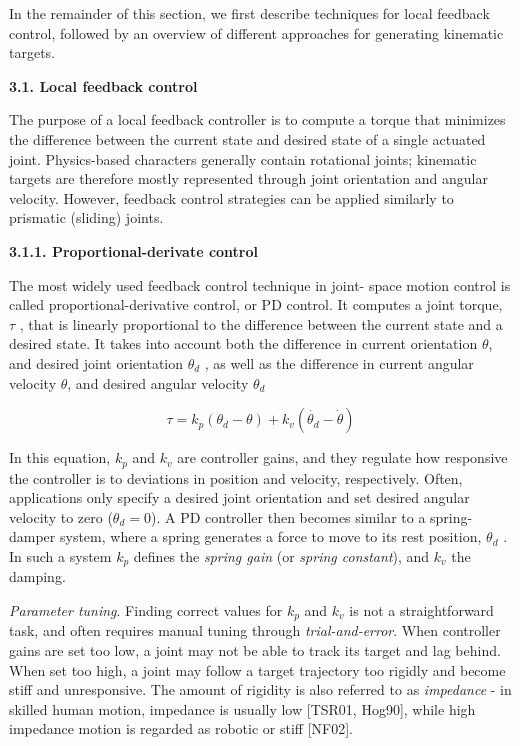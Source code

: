 \documentclass[runningheads,a4paper,10pt]{llncs}
\begin{document}
In the remainder of this section, we first describe techniques for local feedback control, followed by an overview of different approaches for generating kinematic targets. 


\vspace{5mm} %
\textbf{3.1. Local feedback control} 
\vspace{4mm} %

The purpose of a local feedback controller is to compute a torque that minimizes the difference between the current state and desired state of a single actuated joint. Physics-based characters generally contain rotational joints; kinematic targets are therefore mostly represented through joint orientation and angular velocity. However, feedback control strategies can be applied similarly to prismatic (sliding) joints. 


\vspace{5mm} %
\textbf{3.1.1. Proportional-derivate control}
\vspace{4mm} %

The most widely used feedback control technique in joint- space motion control is called proportional-derivative control, or PD control. It computes a joint torque, $\tau$ , that is  linearly proportional to the difference between the current state and a desired state. It takes into account both the difference in current orientation $\theta$, and desired joint orientation $\theta _d$ , as well as the difference in current angular velocity $\theta$, and desired angular velocity $\theta _d$ 

\begin{equation}
\tau=k_p(\theta_d - \theta) + k_v(\dot{\theta_d} - \dot{\theta})
\label{eq:pd_controler}
\end{equation}

In this equation, $k_p$ and $k_v$ are controller gains, and they regulate how responsive the controller is to deviations in position and velocity, respectively. Often, applications only specify a desired joint orientation and set desired angular velocity to zero ($\theta _d = 0$). A PD controller then becomes similar to a spring-damper system, where a spring generates a force to move to its rest position, $\theta _d$ . In such a system $k_p$ defines the \textit{spring gain} (or \textit{spring constant}), and $k_v$ the damping. 

\textit{Parameter tuning}. Finding correct values for $k_p$ and $k_v$ is not a straightforward task, and often requires manual tuning through \textit{trial-and-error}. When controller gains are set too low, a joint may not be able to track its target and lag behind. When set too high, a joint may follow a target trajectory too rigidly and become stiff and unresponsive. The amount of rigidity is also referred to as \textit{impedance} - in skilled human motion, impedance is usually low [TSR01, Hog90], while high impedance motion is regarded as robotic or stiff [NF02]. 
\end{document}
